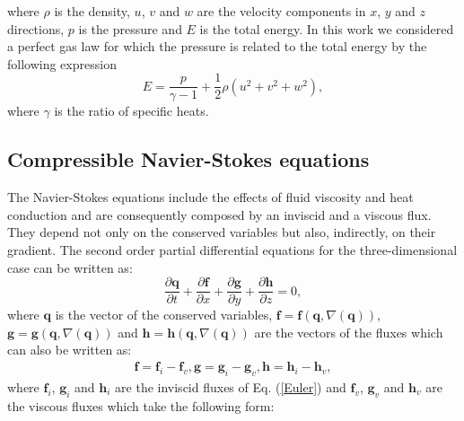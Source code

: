 where $\rho$ is the density, $u$, $v$ and $w$ are the velocity components in $x$, $y$ and
$z$ directions, $p$ is the pressure and $E$ is the total energy. In this work we considered
a perfect gas law for which the pressure is related to the total energy by the following expression
\begin{equation}
E = \frac{p}{\gamma - 1} + \frac{1}{2} \rho(u^2 + v^2 + w^2),
\label{energy}
\end{equation}
where $\gamma$ is the ratio of specific heats.
\subsection{Compressible Navier-Stokes equations}
The Navier-Stokes equations include the effects of fluid viscosity and heat
conduction and are consequently composed by an inviscid and a viscous
flux. They depend not only on the conserved variables but also, indirectly,
on their gradient. The second order partial differential equations for the
three-dimensional case can be written as:
\begin{equation}
\frac{\partial \mathbf{q} }{\partial t} +
\frac{\partial \mathbf{f}}{\partial x} +
\frac{\partial \mathbf{g}}{\partial y} +
\frac{\partial \mathbf{h}}{\partial z} = 0,
\end{equation}
where $\mathbf{q} $ is the vector of the conserved variables, $\mathbf{f} =
\mathbf{f} (\mathbf{q}, \nabla (\mathbf{q}))$,
$\mathbf{g}=  \mathbf{g} (\mathbf{q}, \nabla (\mathbf{q}))$ and $\mathbf{h} =
\mathbf{h} (\mathbf{q}, \nabla (\mathbf{q}))$
are the vectors of the  fluxes which can also be written as:
\begin{equation}
\begin{array}{l}
\mathbf{f} = \mathbf{f}_i - \mathbf{f}_v,
\mathbf{g} = \mathbf{g}_i - \mathbf{g}_v,
\mathbf{h} = \mathbf{h}_i - \mathbf{h}_v,
\end{array}
\end{equation}
where $\mathbf{f}_i$, $\mathbf{g}_i $ and $\mathbf{h}_i$ are the inviscid fluxes
of Eq. (\ref{Euler}) and $\mathbf{f}_v$, $\mathbf{g}_v $ and $\mathbf{h}_v$ are
the viscous fluxes which take the following form:
